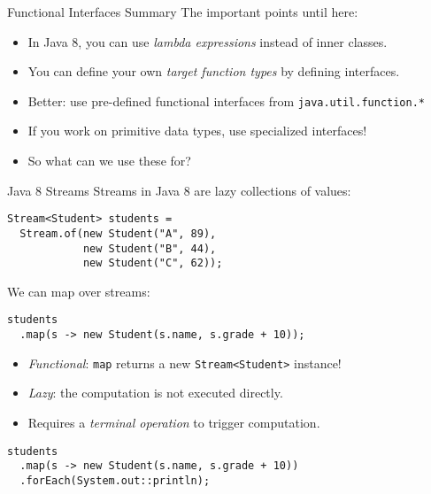 \documentclass{beamer}
\begin{document}
\begin{frame}{Functional Interfaces Summary}
  The important points until here:

  \begin{itemize}
  \pause{} \item In Java 8, you can use \emph{lambda expressions} instead of inner classes.
  \pause{} \item You can define your own \emph{target function types} by defining interfaces.
  \pause{} \item Better: use pre-defined functional interfaces from \lstinline{java.util.function.*}
  \pause{} \item If you work on primitive data types, use specialized interfaces!
  \pause{} \item So what can we use these for?
  \end{itemize}
\end{frame}

\begin{frame}[fragile]{Java 8 Streams}
Streams in Java 8 are lazy collections of values:

\begin{lstlisting}
Stream<Student> students =
  Stream.of(new Student("A", 89),
            new Student("B", 44),
            new Student("C", 62));
\end{lstlisting}

\pause{} We can map over streams:

\begin{lstlisting}
students
  .map(s -> new Student(s.name, s.grade + 10));
\end{lstlisting}

\begin{itemize}
\pause{} \item \emph{Functional}: \lstinline{map} returns a new \lstinline{Stream<Student>} instance!
\pause{} \item \emph{Lazy}: the computation is not executed directly.
\pause{} \item Requires a \emph{terminal operation} to trigger computation.
\end{itemize}

\pause{}

\begin{lstlisting}
students
  .map(s -> new Student(s.name, s.grade + 10))
  .forEach(System.out::println);
\end{lstlisting}
\end{frame}
\end{document}
